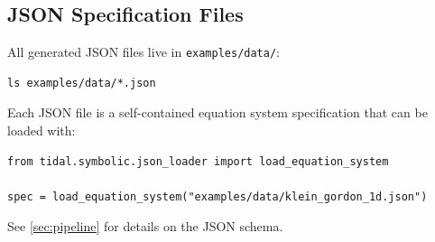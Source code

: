 \subsection{JSON Specification Files}

All generated JSON files live in \texttt{examples/data/}:

\begin{lstlisting}[style=bash]
ls examples/data/*.json
\end{lstlisting}

Each JSON file is a self-contained equation system specification that can be loaded with:

\begin{lstlisting}[style=python]
from tidal.symbolic.json_loader import load_equation_system

spec = load_equation_system("examples/data/klein_gordon_1d.json")
\end{lstlisting}

See \cref{sec:pipeline} for details on the JSON schema.
